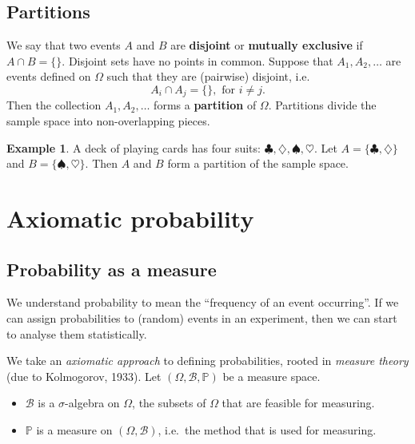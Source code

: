 \documentclass[
]{book}
\providecommand{\tightlist}{%
  \setlength{\itemsep}{0pt}\setlength{\parskip}{0pt}}
\newcommand{\bbP}{\mathbb{P}}
\newcommand{\cB}{{\mathcal B}}
\theoremstyle{definition}
\theoremstyle{definition}
\newtheorem{example}{Example}[chapter]
\theoremstyle{definition}
\theoremstyle{definition}
\theoremstyle{remark}
\begin{document}
\hypertarget{partitions}{%
\subsection{Partitions}\label{partitions}}

We say that two events \(A\) and \(B\) are \textbf{disjoint} or \textbf{mutually exclusive} if \(A \cap B = \{ \}\). Disjoint sets have no points in common.
Suppose that \(A_1,A_2,\dots\) are events defined on \(\Omega\) such that they are (pairwise) disjoint, i.e.~
\[
A_i \cap A_j = \{ \}, \text{ for } i \neq j.
\]
Then the collection \(A_1,A_2,\dots\) forms a \textbf{partition} of \(\Omega\).
Partitions divide the sample space into non-overlapping pieces.

\begin{example}
A deck of playing cards has four suits: \(\clubsuit, \diamondsuit, \spadesuit, \heartsuit\). Let \(A=\{\clubsuit,\diamondsuit\}\) and \(B=\{\spadesuit, \heartsuit\}\). Then \(A\) and \(B\) form a partition of the sample space.
\end{example}

\hypertarget{axiomatic-probability}{%
\section{Axiomatic probability}\label{axiomatic-probability}}

\hypertarget{probability-as-a-measure}{%
\subsection{Probability as a measure}\label{probability-as-a-measure}}

We understand probability to mean the ``frequency of an event occurring''.
If we can assign probabilities to (random) events in an experiment, then we can start to analyse them statistically.

We take an \emph{axiomatic approach} to defining probabilities, rooted in \emph{measure theory} (due to Kolmogorov, 1933).
Let \((\Omega,\cB,\bbP)\) be a measure space.

\begin{itemize}
\tightlist
\item
  \(\cB\) is a \(\sigma\)-algebra on \(\Omega\), the subsets of \(\Omega\) that are feasible for measuring.
\item
  \(\bbP\) is a measure on \((\Omega,\cB)\), i.e.~the method that is used for measuring.
\end{itemize}
\end{document}
